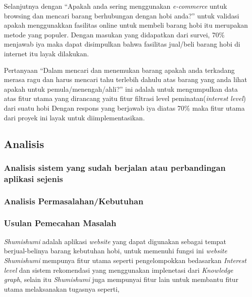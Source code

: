 \documentclass[a4paper]{article}
\newcommand{\subbab}[1]{%
    \subsection{#1}%
    \setcounter{figure}{0}
    \setcounter{table}{0}
}
\newcommand{\subsubbab}[1]{%
    \subsubsection{#1}%
}
\begin{document}
Selanjutnya dengan “Apakah anda sering menggunakan \textit{e-commerce} untuk browsing dan mencari barang berhubungan dengan hobi anda?” untuk validasi apakah menggunakkan fasilitas online untuk membeli barang hobi itu merupakan metode yang populer. Dengan masukan yang didapatkan dari survei, 70\% menjawab iya maka dapat disimpulkan bahwa fasilitas jual/beli barang hobi di internet itu layak dilakukan.


Pertanyaan “Dalam mencari dan menemukan barang apakah anda terkadang merasa ragu dan harus mencari tahu terlebih dahulu atas barang yang anda lihat apakah untuk pemula/menengah/ahli?” ini adalah untuk mengumpulkan data atas fitur utama yang dirancang yaitu fitur filtrasi level peminatan(\textit{interest level}) dari suatu hobi Dengan respons yang berjawab iya diatas 70\% maka fitur utama dari proyek ini layak untuk diimplementasikan.

\subbab{Analisis}
\subsubbab{Analisis sistem yang sudah berjalan atau perbandingan aplikasi sejenis}

\subsubbab{Analisis Permasalahan/Kebutuhan}

\subsubbab{Usulan Pemecahan Masalah}

\textit{Shumishumi} adalah aplikasi \textit{website} yang dapat digunakan sebagai tempat berjual-belinya barang kebutuhan hobi, untuk memenuhi fungsi ini \textit{website Shumishumi} mempunya fitur utama seperti pengelompokkan bedasarkan \textit{Interest level} dan sistem rekomendasi yang menggunakan implenetasi dari \textit{Knowledge graph}, selain itu \textit{Shumishumi} juga mempunyai fitur lain untuk membantu fitur utama melaksanakan tugasnya seperti,
\end{document}
